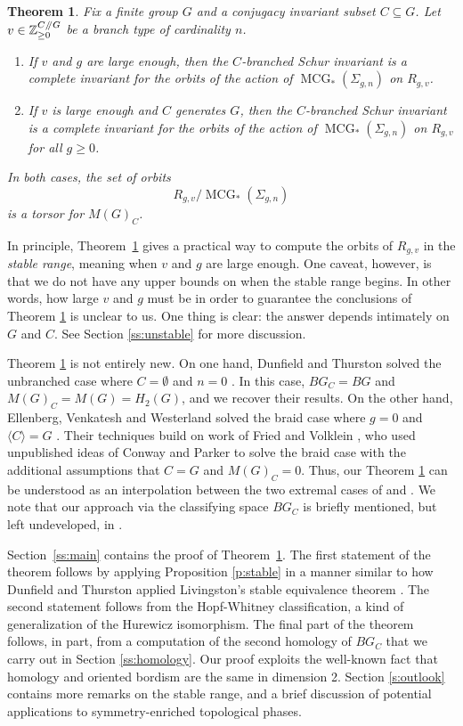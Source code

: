 \documentclass[10pt,twocolumn,amsmath,amssymb,aps,pra,secnumarabic,
    nofootinbib,groupedaddress]{revtex4-1}
\newtheorem{theorem}{Theorem}[section]
\newcommand{\Sec}[1]{Section~\ref{#1}}
\newcommand{\Thm}[1]{Theorem~\ref{#1}}
\newcommand{\Z}{\mathbb{Z}}
\newcommand{\sslash}{\mathbin{/\mkern-5mu/}}
\newcommand{\mcg}[1]{\operatorname{MCG}_*(\Sigma_{#1})}
\begin{document}
\begin{theorem}
Fix a finite group $G$ and a conjugacy invariant subset $C \subseteq G$.  Let $v \in \Z_{\geq 0}^{C\sslash G}$ be a branch type of cardinality $n$.
\begin{enumerate}
\item If $v$ and $g$ are large enough, then the $C$-branched Schur invariant is a complete invariant for the orbits of the action of $\mcg{g,n}$ on $R_{g,v}$.
\item If $v$ is large enough and $C$ generates $G$, then the $C$-branched Schur invariant is a complete invariant for the orbits of the action of $\mcg{g,n}$ on $R_{g,v}$ \emph{for all} $g \geq 0$.
\end{enumerate}
In both cases, the set of orbits
\[ R_{g,v} / \mcg{g,n} \]
is a torsor for $M(G)_C$.
\label{th:main}
\end{theorem}

In principle, \Thm{th:main} gives a practical way to compute the orbits of $R_{g,v}$ in the \emph{stable range}, meaning when $v$ and $g$ are large enough.  One caveat, however, is that we do not have any upper bounds on when the stable range begins.  In other words, how large $v$ and $g$ must be in order to guarantee the conclusions of Theorem \ref{th:main} is unclear to us.  One thing is clear: the answer depends intimately on $G$ and $C$.  See Section \ref{ss:unstable} for more discussion.

Theorem \ref{th:main} is not entirely new.  On one hand, Dunfield and Thurston solved the unbranched case where $C=\emptyset$ and $n=0$ \cite{DunfieldThurston:random}.  In this case, $BG_C=BG$ and $M(G)_C = M(G) = H_2(G)$, and we recover their results.  On the other hand, Ellenberg, Venkatesh and Westerland solved the braid case  where $g=0$ and $\langle C\rangle =G$ \cite{EVW:hurwitz2}.  Their techniques build on work of Fried and Volklein \cite{FriedVolklein:galois}, who used unpublished ideas of Conway and Parker to solve the braid case with the additional assumptions that $C=G$ and $M(G)_C = 0$.  Thus, our Theorem \ref{th:main} can be understood as an interpolation between the two extremal cases of \cite{DunfieldThurston:random} and \cite{EVW:hurwitz2}.  We note that our approach via the classifying space $BG_C$ is briefly mentioned, but left undeveloped, in \cite{EVW:hurwitz2}.

\Sec{ss:main} contains the proof of \Thm{th:main}.  The first statement of the theorem follows by applying Proposition \ref{p:stable} in a manner similar to how Dunfield and Thurston  applied Livingston's stable equivalence theorem \cite{Livingston:stabilizing}.  The second statement follows from the Hopf-Whitney classification, a kind of generalization of the Hurewicz isomorphism.  The final part of the theorem follows, in part, from a computation of the second homology of $BG_C$ that we carry out in Section \ref{ss:homology}.  Our proof exploits the well-known fact that homology and oriented bordism are the same in dimension 2.  Section \ref{s:outlook} contains more remarks on the stable range, and a brief discussion of potential applications to symmetry-enriched topological phases. 
\end{document}
